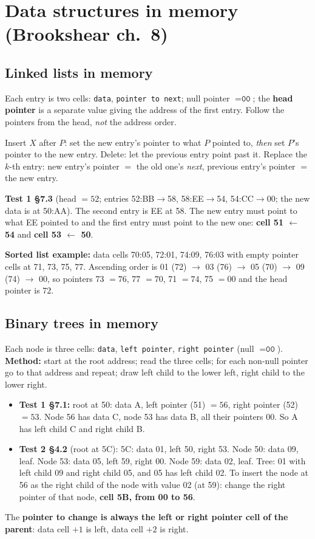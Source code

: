 \documentclass{fkt-notes}
\newcommand{\hx}[1]{\texttt{#1}}
\begin{document}
\newpage
\section{Data structures in memory (Brookshear ch.~8)}

\subsection{Linked lists in memory}
Each entry is two cells: \texttt{data}, \texttt{pointer to next}; null pointer $=\hx{00}$; the \textbf{head pointer}
is a separate value giving the address of the first entry. Follow the pointers from the head, \emph{not} the address order.
\begin{rulebox}[title={Method: insert or replace in a linked list}]
  Insert $X$ after $P$: set the new entry's pointer to what $P$ pointed to, \emph{then} set $P$'s pointer to the
  new entry. Delete: let the previous entry point past it. Replace the $k$-th entry: new entry's pointer $=$ the old one's
  \emph{next}, previous entry's pointer $=$ the new entry.
\end{rulebox}
\textbf{Test 1 \S7.3} (head $=52$; entries 52:BB$\to$58, 58:EE$\to$54, 54:CC$\to$00; the new data is at 50:AA). The second
entry is EE at 58. The new entry must point to what EE pointed to and the first entry must point to the new one:
\textbf{cell 51 $\leftarrow$ 54} and \textbf{cell 53 $\leftarrow$ 50}.

\textbf{Sorted list example:} data cells 70:05, 72:01, 74:09, 76:03 with empty pointer cells at 71, 73, 75, 77. Ascending order is
01 (72) $\to$ 03 (76) $\to$ 05 (70) $\to$ 09 (74) $\to$ 00, so pointers 73 $=76$, 77 $=70$, 71 $=74$, 75 $=00$ and the head pointer is $72$.

\subsection{Binary trees in memory}
Each node is three cells: \texttt{data}, \texttt{left pointer}, \texttt{right pointer} (null $=\hx{00}$).
\textbf{Method:} start at the root address; read the three cells; for each non-null pointer go to that address
and repeat; draw left child to the lower left, right child to the lower right.
\begin{itemize}[nosep]
  \item \textbf{Test 1 \S7.1:} root at 50: data A, left pointer (51) $=56$, right pointer (52) $=53$.
        Node 56 has data C, node 53 has data B, all their pointers 00. So A has left child C and right child B.
  \item \textbf{Test 2 \S4.2} (root at 5C): 5C: data 01, left 50, right 53. Node 50: data 09, leaf. Node 53: data 05,
        left 59, right 00. Node 59: data 02, leaf. Tree: 01 with left child 09 and right child 05, and 05 has left child 02.
        To insert the node at 56 as the right child of the node with value 02 (at 59): change the right pointer of
        that node, \textbf{cell 5B, from 00 to 56}.
\end{itemize}
The \textbf{pointer to change is always the left or right pointer cell of the parent}: data cell $+1$ is left,
data cell $+2$ is right.
\end{document}
